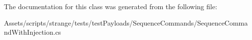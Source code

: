 The documentation for this class was generated from the following file\-:\begin{DoxyCompactItemize}
\item 
Assets/scripts/strange/tests/test\-Payloads/\-Sequence\-Commands/Sequence\-Command\-With\-Injection.\-cs\end{DoxyCompactItemize}
